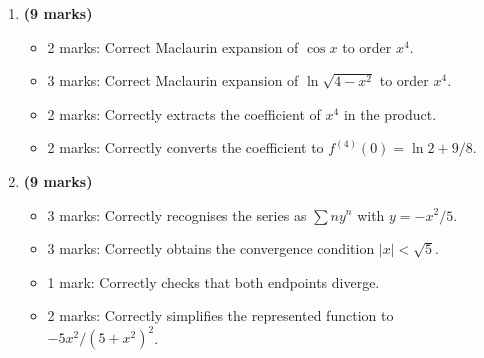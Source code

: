 \documentclass[12pt]{article}
\begin{document}
\begin{enumerate}[label=(\alph*)]
\item \textbf{(9 marks)}
\begin{itemize}
\item 2 marks: Correct Maclaurin expansion of $\cos x$ to order $x^4$.
\item 3 marks: Correct Maclaurin expansion of $\ln\sqrt{4-x^2}$ to order $x^4$.
\item 2 marks: Correctly extracts the coefficient of $x^4$ in the product.
\item 2 marks: Correctly converts the coefficient to $f^{(4)}(0)=\ln2+9/8$.
\end{itemize}

\item \textbf{(9 marks)}
\begin{itemize}
\item 3 marks: Correctly recognises the series as $\sum ny^n$ with $y=-x^2/5$.
\item 3 marks: Correctly obtains the convergence condition $|x|<\sqrt5$.
\item 1 mark: Correctly checks that both endpoints diverge.
\item 2 marks: Correctly simplifies the represented function to $-5x^2/(5+x^2)^2$.
\end{itemize}
\end{enumerate}
\end{document}
